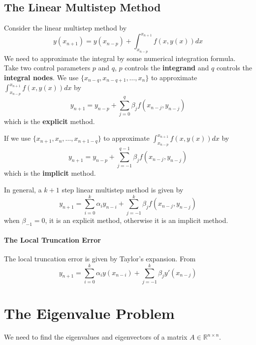 \documentclass{matharticle}
\begin{document}
\subsection{The Linear Multistep Method}
Consider the linear multistep method by
\begin{equation}
	y(x_{n+1}) = y(x_{n-p}) + \int_{x_{n-p}}^{x_{n+1}} f(x, y(x)) dx
\end{equation}
We need to approximate the integral by some numerical integration formula. Take two control parameters $p$ and $q$, $p$ controls the \textbf{integrand} and $q$ controls the \textbf{integral nodes}. We use $\{x_{n-q}, x_{n-q+1}, \ldots, x_n\}$ to approximate $\int_{x_{n-p}}^{x_{n+1}} f(x, y(x)) dx$ by
\begin{equation}
	y_{n+1} = y_{n-p} + \sum_{j=0}^{q} \beta_j f(x_{n-j}, y_{n-j})
\end{equation}
which is the \textbf{explicit} method.

If we use $\{x_{n+1}, x_n, \ldots, x_{n+1-q}\}$ to approximate $\int_{x_{n-p}}^{x_{n+1}} f(x, y(x)) dx$ by
\begin{equation}
	y_{n+1} = y_{n-p} + \sum_{j=-1}^{q-1} \beta_j f(x_{n-j}, y_{n-j})
\end{equation}
which is the \textbf{implicit} method.

\begin{definition}
	In general, a $k+1$ step linear multistep method is given by
	\begin{equation}
		y_{n+1} = \sum_{i=0}^{k} \alpha_i y_{n-i} + \sum_{j=-1}^{k} \beta_j f(x_{n-j}, y_{n-j})
	\end{equation}
	when $\beta_{-1} = 0$, it is an explicit method, otherwise it is an implicit method.
\end{definition}

\paragraph{The Local Truncation Error}
The local truncation error is given by Taylor's expansion. From
\begin{equation*}
	y_{n+1} = \sum_{i=0}^{k} \alpha_i y(x_{n-i}) + \sum_{j=-1}^{k} \beta_j y'(x_{n-j})
\end{equation*}

\section{The Eigenvalue Problem}
We need to find the eigenvalues and eigenvectors of a matrix $A \in \mathbb{R}^{n \times n}$.
\end{document}
